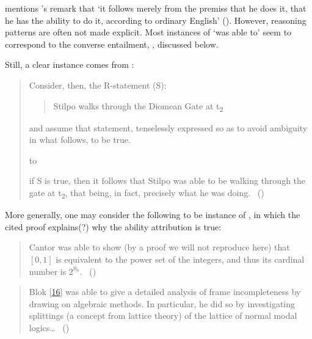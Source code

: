 \begin{note}
{    \textcite[1]{Boylan:2020aa} mentions \citeauthor{Austin:1961vz}'s  remark that `it follows merely from the premiss that he does it, that he has the ability to do it, according to ordinary English' (\citeyear[175]{Austin:1961vz}).
    However, reasoning patterns are often not made explicit.
    Most instances of `was able to' seem to correspond to the converse entailment, \BoyPSC{}, discussed below.

    Still, a clear instance comes from \textcite{Taylor:2011uh}:
    \begin{quote}
      Consider, then, the R-statement (S):

      \begin{quote}
        Stilpo walks through the Diomean Gate at t\textsubscript{2}
      \end{quote}

      and assume that statement, tenselessly expressed so as to avoid ambiguity in what follows, to be true.

      \hbox to \hsize{\hfil{\vdots}\hfil}

      if S is true, then it follows that Stilpo was able to be walking through the gate at t\textsubscript{2}, that being, in fact, precisely what he was doing.%
      \mbox{ }\hfill\mbox{(\cite[139--143]{Taylor:2011uh})}
    \end{quote}

    More generally, one may consider the following to be instance of \BoyPS{}, in which the cited proof explains(?) why the ability attribution is true:

    \begin{quote}
      Cantor was able to show (by a proof we will not reproduce here) that \([0, 1]\) is equivalent to the power set of the integers, and thus its cardinal number is \(2^{\aleph_{0}}\).\newline
      \mbox{ }\hfill\mbox{(\cite[65]{Partee:1990tu})}
    \end{quote}

    \begin{quote}
      Blok [\hyperlink{cite.Blok:1980th}{16}] was able to give a detailed analysis of frame incompleteness by drawing on algebraic methods.
      In particular, he did so by investigating splittings (a concept from lattice theory) of the lattice of normal modal logics\dots\newline
      \mbox{ }\hfill\mbox{(\cite[74]{Blackburn:2007wa})}
    \end{quote}
  }
\end{note}


